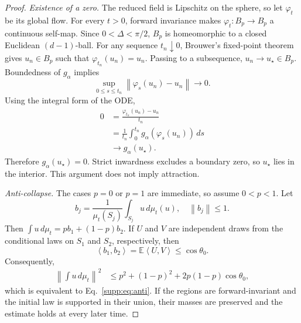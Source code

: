 \documentclass[11pt]{article}
\newcommand{\E}{\mathbb{E}}
\newcommand{\norm}[1]{\left\lVert #1 \right\rVert}
\newcommand{\ip}[2]{\left\langle #1,#2 \right\rangle}
\begin{document}
\begin{proof}
\emph{Existence of a zero.}
The reduced field is Lipschitz on the sphere, so let $\varphi_t$ be its global
flow. For every $t>0$, forward invariance makes
$\varphi_t:B_p\to B_p$ a continuous self-map. Since
$0<\Delta<\pi/2$, $B_p$ is homeomorphic to a closed Euclidean
$(d-1)$-ball. For any sequence $t_n\downarrow0$, Brouwer's fixed-point theorem
gives $u_n\in B_p$ such that $\varphi_{t_n}(u_n)=u_n$. Passing to a subsequence,
$u_n\to u_\star\in B_p$. Boundedness of $g_\alpha$ implies
\begin{equation}
\sup_{0\le s\le t_n}\norm{\varphi_s(u_n)-u_n}\longrightarrow0.
\end{equation}
Using the integral form of the ODE,
\begin{equation}
\begin{aligned}
0
&=\frac{\varphi_{t_n}(u_n)-u_n}{t_n}\\
&=\frac1{t_n}\int_0^{t_n}
  g_\alpha(\varphi_s(u_n))\,ds\\
&\longrightarrow g_\alpha(u_\star).
\end{aligned}
\end{equation}
Therefore $g_\alpha(u_\star)=0$. Strict inwardness excludes a boundary zero, so
$u_\star$ lies in the interior. This argument does not imply attraction.

\emph{Anti-collapse.}
The cases $p=0$ or $p=1$ are immediate, so assume $0<p<1$. Let
\begin{equation}
b_j=\frac{1}{\mu_t(S_j)}\int_{S_j}u\,d\mu_t(u),
\quad \norm{b_j}\le1.
\end{equation}
Then $\int u\,d\mu_t=p b_1+(1-p)b_2$. If $U$ and $V$ are independent draws from
the conditional laws on $S_1$ and $S_2$, respectively, then
\begin{equation}
\ip{b_1}{b_2}=\E\ip{U}{V}\le\cos\theta_0.
\end{equation}
Consequently,
\begin{align}
\norm{\int u\,d\mu_t}^2
&\le p^2+(1-p)^2+2p(1-p)\cos\theta_0,
\end{align}
which is equivalent to Eq.~\eqref{supp:eq:anti}. If the regions are
forward-invariant and the initial law is supported in their union, their masses
are preserved and the estimate holds at every later time.
\end{proof}
\end{document}
